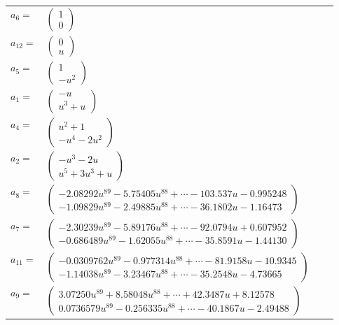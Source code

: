 \documentclass[1p]{elsarticle_modified}
\theoremstyle{definition}
\begin{document}
\begin{tabular}{m{7pt} m{180pt} m{7pt} m{180pt} }
\flushright $a_{6}=$&$\begin{pmatrix}1\\0\end{pmatrix}$ \\
\flushright $a_{12}=$&$\begin{pmatrix}0\\u\end{pmatrix}$ \\
\flushright $a_{5}=$&$\begin{pmatrix}1\\- u^2\end{pmatrix}$ \\
\flushright $a_{1}=$&$\begin{pmatrix}- u\\u^3+u\end{pmatrix}$ \\
\flushright $a_{4}=$&$\begin{pmatrix}u^2+1\\- u^4-2 u^2\end{pmatrix}$ \\
\flushright $a_{2}=$&$\begin{pmatrix}- u^3-2 u\\u^5+3 u^3+u\end{pmatrix}$ \\
\flushright $a_{8}=$&$\begin{pmatrix}-2.08292 u^{89}-5.75405 u^{88}+\cdots-103.537 u-0.995248\\-1.09829 u^{89}-2.49885 u^{88}+\cdots-36.1802 u-1.16473\end{pmatrix}$ \\
\flushright $a_{7}=$&$\begin{pmatrix}-2.30239 u^{89}-5.89176 u^{88}+\cdots-92.0794 u+0.607952\\-0.686489 u^{89}-1.62055 u^{88}+\cdots-35.8591 u-1.44130\end{pmatrix}$ \\
\flushright $a_{11}=$&$\begin{pmatrix}-0.0309762 u^{89}-0.977314 u^{88}+\cdots-81.9158 u-10.9345\\-1.14038 u^{89}-3.23467 u^{88}+\cdots-35.2548 u-4.73665\end{pmatrix}$ \\
\flushright $a_{9}=$&$\begin{pmatrix}3.07250 u^{89}+8.58048 u^{88}+\cdots+42.3487 u+8.12578\\0.0736579 u^{89}-0.256335 u^{88}+\cdots-40.1867 u-2.49488\end{pmatrix}$ \\

\end{tabular}
\end{document}
